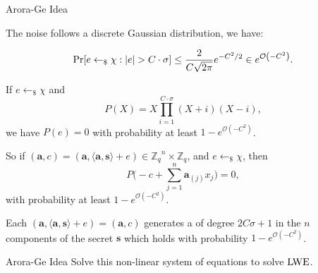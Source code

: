 \documentclass[10pt]{beamer}
\newcommand{\bigO}[1]{\ensuremath{\mathcal{O}\left({#1}\right)}\xspace}
\newcommand{\Zq}{\ensuremath{\mathbb{Z}_q}}
\newcommand{\sample}{\ensuremath{\leftarrow_{\$}}}
\newcommand{\abs}[1]{\ensuremath{|#1|}\xspace}
\renewcommand{\Pr}{\textnormal{Pr}}
\newcommand\LWE{\ensuremath{{\rm LWE}}\xspace}
\renewcommand{\vec}[1]{\mathbf{#1}\xspace}
\newcommand{\cemph}[1]{{\color{yellow9}{\bf #1}}\xspace}
\begin{document}
\begin{frame}[allowframebreaks]{Arora-Ge Idea}

The noise follows a discrete Gaussian distribution, we have:

$$
\Pr [e \sample \chi : \abs{e} >C \cdot \sigma ]  \leq  \frac{2}{C \sqrt{2 \pi}}e^{-C^2/2} \in e^{\bigO{-C^2}}.
$$

\vspace{1em}

\hspace{-15em}

\framebreak

If $e \sample \chi$ and
$$
P(X)=X \prod_{i=1}^{C \cdot \sigma}(X+i)(X-i),
$$
we have $P(e) = 0$  with probability at least $1- e^{\bigO{-C^2}}$.

\vspace{1em}

So if $(\vec{a},c)  = (\vec{a},\langle\vec{a},\vec{s}\rangle+e) \in \Zq^n \times \Zq$, and $e \sample \chi$, then
\begin{equation}\label{agequation}
P\big(-c + \sum_{j=1}^{n} \mathbf{a}_{(j)}x_j\big)=0,
\end{equation}
with probability at least $1-e^{\bigO{-C^2}}$. 

\framebreak

Each $(\vec{a},\langle\vec{a},\vec{s}\rangle + e)=(\vec{a},c)$ generates a \cemph{non-linear equation} of degree $2C\sigma+1$ in the $n$ components of the secret $\vec{s}$ which holds with probability $1-e^{\bigO{-C^2}}$.


\vspace{1em}

\begin{block}{Arora-Ge Idea}
Solve this non-linear system of equations to solve \LWE.
\end{block}

\vspace{1em}
\end{frame}
\end{document}
